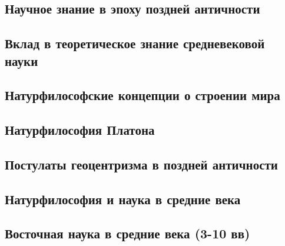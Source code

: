 \documentclass[main.tex]{subfiles}
\begin{document}

\subsection{Научное знание в эпоху поздней античности}


\subsection{Вклад в теоретическое знание средневековой науки}


\subsection{Натурфилософские концепции о строении мира}




\subsection{Натурфилософия Платона}


\subsection{Постулаты геоцентризма в поздней античности}



\subsection{Натурфилософия и наука в средние века}




\subsection{Восточная наука в средние века (3-10 вв)}
\end{document}
